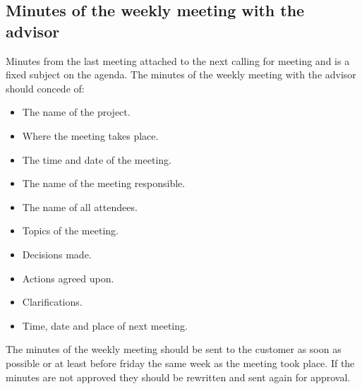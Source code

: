 \subsection{Minutes of the weekly meeting with the advisor}
Minutes from the last meeting attached to the next calling for meeting and is a fixed subject on the agenda.
\newline
\newline
The minutes of the weekly meeting with the advisor should concede of:
\begin{itemize}
\item{}The name of the project.
\item{}Where the meeting takes place.
\item{}The time and date of the meeting.
\item{}The name of the meeting responsible.
\item{}The name of all attendees.
\item{}Topics of the meeting.
\item{}Decisions made.
\item{}Actions agreed upon.
\item{}Clarifications.
\item{}Time, date and place of next meeting.
\end{itemize}

The minutes of the weekly meeting should be sent to the customer as soon as possible or at least before friday the same week as the meeting took place. If the minutes are not approved they should be rewritten and sent again for approval. 


